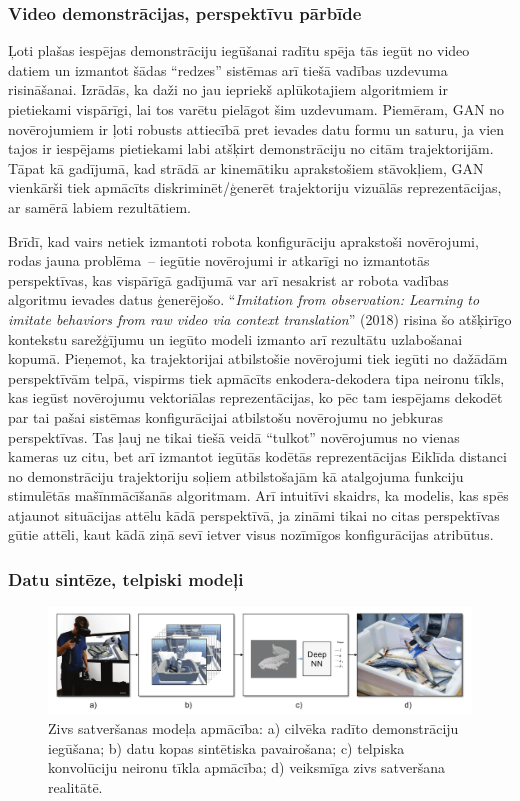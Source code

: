 \documentclass[12pt, a4paper]{article}
\numberwithin{equation}{section} %
\begin{document}
\subsubsection{Video demonstrācijas, perspektīvu pārbīde}

Ļoti plašas iespējas demonstrāciju iegūšanai radītu spēja tās iegūt no video datiem un izmantot šādas ``redzes'' sistēmas arī tiešā vadības uzdevuma risināšanai. Izrādās, ka daži no jau iepriekš aplūkotajiem algoritmiem ir pietiekami vispārīgi, lai tos varētu pielāgot šim uzdevumam. Piemēram, GAN no novērojumiem \cite{torabi2018generative} ir ļoti robusts attiecībā pret ievades datu formu un saturu, ja vien tajos ir iespējams pietiekami labi atšķirt demonstrāciju no citām trajektorijām. Tāpat kā gadījumā, kad strādā ar kinemātiku aprakstošiem stāvokļiem, GAN vienkārši tiek apmācīts diskriminēt/ģenerēt trajektoriju vizuālās reprezentācijas, ar samērā labiem rezultātiem.


Brīdī, kad vairs netiek izmantoti robota konfigurāciju aprakstoši novērojumi, rodas jauna problēma~-- iegūtie novērojumi ir atkarīgi no izmantotās perspektīvas, kas vispārīgā gadījumā var arī nesakrist ar robota vadības algoritmu ievades datus ģenerējošo. ``\textit{Imitation from observation: Learning to imitate behaviors from raw video via context translation}'' \cite{liu2018imitation} (2018) risina šo atšķirīgo kontekstu sarežģījumu un iegūto modeli izmanto arī rezultātu uzlabošanai kopumā. Pieņemot, ka trajektorijai atbilstošie novērojumi tiek iegūti no dažādām perspektīvām telpā, vispirms tiek apmācīts enkodera-dekodera tipa neironu tīkls, kas iegūst novērojumu vektoriālas reprezentācijas, ko pēc tam iespējams dekodēt par tai pašai sistēmas konfigurācijai atbilstošu novērojumu no jebkuras perspektīvas. Tas ļauj ne tikai tiešā veidā ``tulkot'' novērojumus no vienas kameras uz citu, bet arī izmantot iegūtās kodētās reprezentācijas Eiklīda distanci no demonstrāciju trajektoriju soļiem atbilstošajām kā atalgojuma funkciju stimulētās mašīnmācīšanās algoritmam. Arī intuitīvi skaidrs, ka modelis, kas spēs atjaunot situācijas attēlu kādā perspektīvā, ja zināmi tikai no citas perspektīvas gūtie attēli, kaut kādā ziņā sevī ietver visus nozīmīgos konfigurācijas atribūtus.

\subsubsection{Datu sintēze, telpiski modeļi}

\begin{figure}[t!]
    \centering
    \includegraphics[width=16cm]{../img/fish.png}
    \caption{Zivs satveršanas modeļa apmācība: a) cilvēka radīto demonstrāciju iegūšana; b) datu kopas sintētiska pavairošana; c) telpiska konvolūciju neironu tīkla apmācība; d) veiksmīga zivs satveršana realitātē. \cite{dyrstad2018teaching}}
\end{figure}
\end{document}
